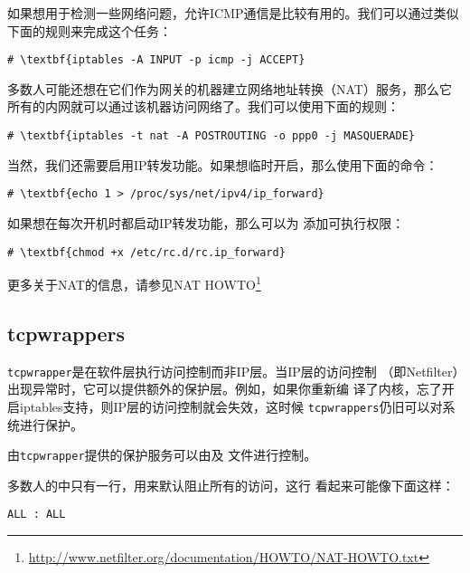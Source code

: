 如果想用于检测一些网络问题，允许ICMP通信是比较有用的。我们可以通过类似
下面的规则来完成这个任务：
\begin{Verbatim}[frame=single, commandchars=\\\{\}]
# \textbf{iptables -A INPUT -p icmp -j ACCEPT}
\end{Verbatim}

多数人可能还想在它们作为网关的机器建立网络地址转换（NAT）服务，那么它
所有的内网就可以通过该机器访问网络了。我们可以使用下面的规则：
\begin{Verbatim}[frame=single, commandchars=\\\{\}]
# \textbf{iptables -t nat -A POSTROUTING -o ppp0 -j MASQUERADE}
\end{Verbatim}

当然，我们还需要启用IP转发功能。如果想临时开启，那么使用下面的命令：
\begin{Verbatim}[frame=single, commandchars=\\\{\}]
  # \textbf{echo 1 > /proc/sys/net/ipv4/ip_forward}
\end{Verbatim}

如果想在每次开机时都启动IP转发功能，那么可以为
添加可执行权限：
\begin{Verbatim}[frame=single, commandchars=\\\{\}]
# \textbf{chmod +x /etc/rc.d/rc.ip_forward}
\end{Verbatim}

更多关于NAT的信息，请参见NAT
HOWTO\footnote{\url{http://www.netfilter.org/documentation/HOWTO/NAT-HOWTO.txt}}

\subsection{tcpwrappers}
\label{sec:security:hostAccessControl:tcpwrappers}

\texttt{tcpwrapper}是在软件层执行访问控制而非IP层。当IP层的访问控制
（即Netfilter）出现异常时，它可以提供额外的保护层。例如，如果你重新编
译了内核，忘了开启iptables支持，则IP层的访问控制就会失效，这时候
\texttt{tcpwrappers}仍旧可以对系统进行保护。

由\texttt{tcpwrapper}提供的保护服务可以由及
文件进行控制。

多数人的中只有一行，用来默认阻止所有的访问，这行
看起来可能像下面这样：
\begin{Verbatim}[frame=single, commandchars=\\\{\}]
ALL : ALL
\end{Verbatim}

